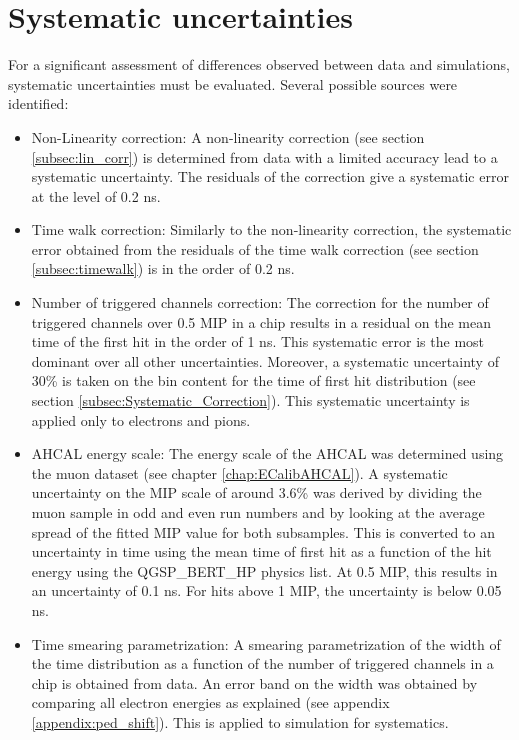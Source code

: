 \section{Systematic uncertainties}

For a significant assessment of differences observed between data and simulations, systematic uncertainties must be evaluated. Several possible sources were identified:

\begin{itemize}
	\item Non-Linearity correction: A non-linearity correction (see section \ref{subsec:lin_corr}) is determined from data with a limited accuracy lead to a systematic uncertainty. The residuals of the correction give a systematic error at the level of 0.2 ns.
	\item Time walk correction: Similarly to the non-linearity correction, the systematic error obtained from the residuals of the time walk correction (see section \ref{subsec:timewalk}) is in the order of 0.2 ns.
	\item Number of triggered channels correction: The correction for the number of triggered channels over 0.5 MIP in a chip results in a residual on the mean time of the first hit in the order of 1 ns. This systematic error is the most dominant over all other uncertainties. Moreover, a systematic uncertainty of 30\% is taken on the bin content for the time of first hit distribution (see section \ref{subsec:Systematic_Correction}). This systematic uncertainty is applied only to electrons and pions.
	\item AHCAL energy scale: The energy scale of the AHCAL was determined using the muon dataset (see chapter \ref{chap:ECalibAHCAL}). A systematic uncertainty on the MIP scale of around 3.6\% was derived by dividing the muon sample in odd and even run numbers and by looking at the average spread of the fitted MIP value for both subsamples. This is converted to an uncertainty in time using the mean time of first hit as a function of the hit energy using the QGSP\_BERT\_HP physics list. At 0.5 MIP, this results in an uncertainty of 0.1 ns. For hits above 1 MIP, the uncertainty is below 0.05 ns.
	\item Time smearing parametrization: A smearing parametrization of the width of the time distribution as a function of the number of triggered channels in a chip is obtained from data. An error band on the width was obtained by comparing all electron energies as explained (see appendix \ref{appendix:ped_shift}). This is applied to simulation for systematics.

\end{itemize}

